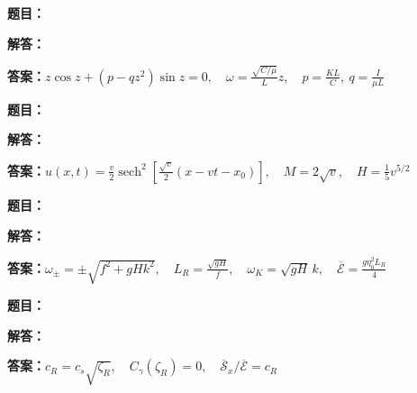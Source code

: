 \documentclass[lang=cn,color=blue,11pt]{elegantbook}
\begin{document}
\noindent\textbf{题目：}
\par\noindent\textbf{解答：}
\par\noindent\textbf{答案：}\(\displaystyle z\cos z+(p-qz^2)\sin z=0,\quad \omega=\frac{\sqrt{C/\mu}}{L}z,\quad p=\frac{KL}{C},\ q=\frac{I}{\mu L}\)\par
\par\smallskip\noindent\hrulefill\par\medskip
{}\par
\noindent\textbf{题目：}
\par\noindent\textbf{解答：}
\par\noindent\textbf{答案：}\(\displaystyle u(x,t)=\frac v2\operatorname{sech}^2\!\left[\frac{\sqrt v}{2}(x-vt-x_0)\right],\quad M=2\sqrt v,\quad H=\frac15v^{5/2}\)\par
\par\smallskip\noindent\hrulefill\par\medskip
{}\par
\noindent\textbf{题目：}
\par\noindent\textbf{解答：}
\par\noindent\textbf{答案：}\(\displaystyle \omega_\pm=\pm\sqrt{f^2+gHk^2},\quad L_R=\frac{\sqrt{gH}}{f},\quad \omega_K=\sqrt{gH}\,k,\quad \overline{\mathscr E}=\frac{g\eta_0^2L_R}{4}\)\par
\par\smallskip\noindent\hrulefill\par\medskip
{}\par
\noindent\textbf{题目：}
\par\noindent\textbf{解答：}
\par\noindent\textbf{答案：}\(\displaystyle c_R=c_s\sqrt{\zeta_R},\quad C_\gamma(\zeta_R)=0,\quad \overline{\mathscr S}_x/\overline{\mathscr E}=c_R\)\par
\par\smallskip\noindent\hrulefill\par\medskip
\end{document}
